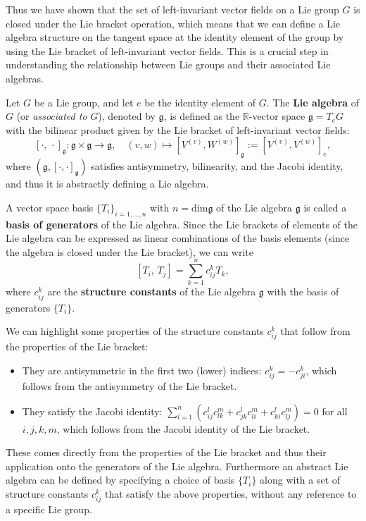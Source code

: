 Thus we have shown that the set of left-invariant vector fields on a Lie group \(G\) is closed under the Lie bracket operation, which means that we can define a Lie algebra structure on the tangent space at the identity element of the group by using the Lie bracket of left-invariant vector fields. This is a crucial step in understanding the relationship between Lie groups and their associated Lie algebras.

\begin{definition}
    Let \(G\) be a Lie group, and let \(e\) be the identity element of \(G\). The \textbf{Lie algebra} of \(G\) (or \textit{associated to} \(G\)), denoted by \(\mathfrak{g}\), is defined as the \(\mathbb{R}\)-vector space \(\mathfrak{g} = T_e G\) with the bilinear product given by the Lie bracket of left-invariant vector fields:
    \[
        [\cdot,\,\cdot]_\mathfrak{g} : \mathfrak{g} \times \mathfrak{g} \to \mathfrak{g}, \quad (v,w) \mapsto [V^{(v)},W^{(w)}]_\mathfrak{g} := [V^{(v)}, V^{(w)}]_e,
    \]
    where \((\mathfrak{g}, [\cdot,\cdot]_\mathfrak{g})\) satisfies antisymmetry, bilinearity, and the Jacobi identity, and thus it is abstractly defining a Lie algebra.
\end{definition}

\begin{definition}
    A vector space basis \(\{T_i\}_{i=1,\dots,n}\) with \(n = \text{dim}\mathfrak{g}\) of the Lie algebra \(\mathfrak{g}\) is called a \textbf{basis of generators} of the Lie algebra. Since the Lie brackets of elements of the Lie algebra can be expressed as linear combinations of the basis elements (since the algebra is closed under the Lie bracket), we can write
    \[
        [T_i,\,T_j] = \sum_{k=1}^n c_{ij}^k T_k,
    \]
    where \(c_{ij}^k\) are the \textbf{structure constants} of the Lie algebra \(\mathfrak{g}\) with the basis of generators \(\{T_i\}\).
\end{definition}

We can highlight some properties of the structure constants \(c_{ij}^k\) that follow from the properties of the Lie bracket:
\begin{itemize}
    \item They are antisymmetric in the first two (lower) indices: \(c_{ij}^k = -c_{ji}^k\), which follows from the antisymmetry of the Lie bracket.
    \item They satisfy the Jacobi identity: \(\sum_{l=1}^n (c_{ij}^l c_{lk}^m + c_{jk}^l c_{li}^m + c_{ki}^l c_{lj}^m) = 0\) for all \(i,j,k,m\), which follows from the Jacobi identity of the Lie bracket.
\end{itemize}
These comes directly from the properties of the Lie bracket and thus their application onto the generators of the Lie algebra. Furthermore an abstract Lie algebra can be defined by specifying a choice of basis \(\{T_i\}\) along with a set of structure constants \(c_{ij}^k\) that satisfy the above properties, without any reference to a specific Lie group.

